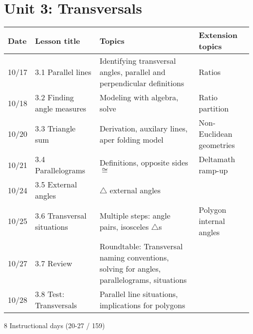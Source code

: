 \documentclass[12pt, twoside]{article}
\begin{document}
\section*{Unit 3: Transversals}
\begin{tabular}{|p{0.9cm}|p{4cm}|p{7cm}|p{5cm}|}
  \hline
  Date & Lesson title & Topics  & Extension topics \\
  \hline
  10/17 & 3.1 Parallel lines & Identifying transversal angles, parallel and perpendicular definitions & Ratios \\
  \hline
  10/18 & 3.2 Finding angle measures & Modeling with algebra, solve & Ratio partition \\
  \hline
  10/20 & 3.3 Triangle sum & Derivation, auxilary lines, aper folding model & Non-Euclidean geometries \\
  \hline
  10/21 & 3.4 Parallelograms & Definitions, opposite sides $\cong$ & Deltamath ramp-up \\
  \hline
  10/24 & 3.5 External angles & $\triangle$ external angles &  \\
  \hline
  10/25 & 3.6 Transversal situations & Multiple steps: angle pairs, isosceles $\triangle$s & Polygon internal angles \\
  \hline
  10/27 & 3.7 Review & Roundtable: Transversal naming conventions, solving for angles, parallelograms, situations & \\
  \hline
  10/28 & 3.8 Test: Transversals & Parallel line situations, implications for polygons &  \\
  \hline

\end{tabular} \par \vspace*{0.3cm}
8 Instructional days (20-27 / 159)


\newpage
\end{document}
